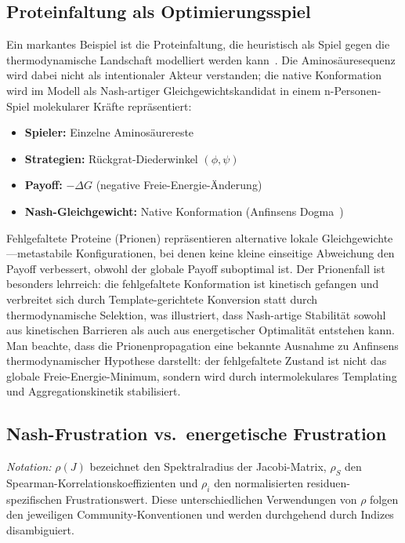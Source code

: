 \documentclass[12pt,a4paper]{article}
\theoremstyle{remark}
\begin{document}
\subsection{Proteinfaltung als Optimierungsspiel}

Ein markantes Beispiel ist die Proteinfaltung, die heuristisch als Spiel gegen die thermodynamische Landschaft modelliert werden kann~\citep{EnzymeFolding}. Die Aminosäuresequenz wird dabei nicht als intentionaler Akteur verstanden; die native Konformation wird im Modell als Nash-artiger Gleichgewichtskandidat in einem n-Personen-Spiel molekularer Kräfte repräsentiert:

\begin{itemize}
    \item \textbf{Spieler:} Einzelne Aminosäurereste
    \item \textbf{Strategien:} Rückgrat-Diederwinkel $(\phi, \psi)$
    \item \textbf{Payoff:} $-\Delta G$ (negative Freie-Energie-Änderung)
    \item \textbf{Nash-Gleichgewicht:} Native Konformation (Anfinsens Dogma~\citep{Anfinsen1973})
\end{itemize}

Fehlgefaltete Proteine (Prionen) repräsentieren alternative lokale Gleichgewichte---metastabile Konfigurationen, bei denen keine kleine einseitige Abweichung den Payoff verbessert, obwohl der globale Payoff suboptimal ist. Der Prionenfall ist besonders lehrreich: die fehlgefaltete Konformation ist kinetisch gefangen und verbreitet sich durch Template-gerichtete Konversion statt durch thermodynamische Selektion, was illustriert, dass Nash-artige Stabilität sowohl aus kinetischen Barrieren als auch aus energetischer Optimalität entstehen kann. Man beachte, dass die Prionenpropagation eine bekannte Ausnahme zu Anfinsens thermodynamischer Hypothese darstellt: der fehlgefaltete Zustand ist nicht das globale Freie-Energie-Minimum, sondern wird durch intermolekulares Templating und Aggregationskinetik stabilisiert.

\subsection{Nash-Frustration vs.\ energetische Frustration}

\noindent\textit{Notation:} $\rho(J)$ bezeichnet den Spektralradius der Jacobi-Matrix, $\rho_S$ den Spearman-Korrelationskoeffizienten und $\rho_i$ den normalisierten residuen-spezifischen Frustrationswert. Diese unterschiedlichen Verwendungen von $\rho$ folgen den jeweiligen Community-Konventionen und werden durchgehend durch Indizes disambiguiert.
\end{document}
